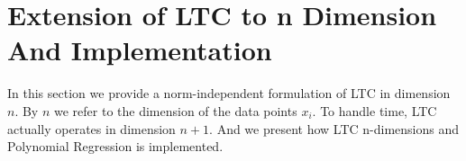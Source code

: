\chapter{Extension of LTC to n Dimension And Implementation}
In this section we provide a norm-independent formulation of LTC in dimension
$n$. By $n$ we refer to the dimension of the data points $x_i$. To handle time,
LTC actually operates in dimension $n+1$. And we present how LTC n-dimensions
and Polynomial Regression is implemented.



